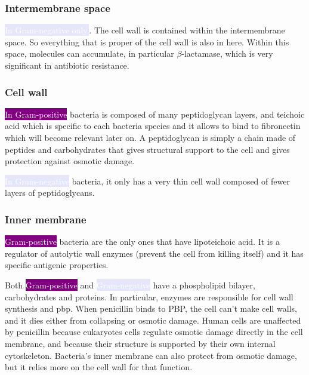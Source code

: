 \subsubsection{Intermembrane space}

\colorbox{Lavender}{\textcolor{white}{In Gram-negative only.}}. The cell wall is contained within the intermembrane space. So everything that is proper of the cell wall is also in here. Within this space, molecules can accumulate, in particular $\beta$-lactamase, which is very significant in antibiotic resistance.

\subsubsection{Cell wall}

\colorbox{Purple}{\textcolor{white}{In Gram-positive}} bacteria is composed of many peptidoglycan layers, and teichoic acid which is specific to each bacteria species and it allows to bind to fibronectin which will become relevant later on. A peptidoglycan is simply a chain made of peptides and carbohydrates that gives structural support to the cell and gives protection against osmotic damage.

\colorbox{Lavender}{\textcolor{white}{In Gram-negative}} bacteria, it only has a very thin cell wall composed of fewer layers of peptidoglycans.


\subsubsection{Inner membrane}

\colorbox{Purple}{\textcolor{white}{Gram-positive}} bacteria are the only ones that have lipoteichoic acid. It is a regulator of autolytic wall enzymes (prevent the cell from killing itself) and it has specific antigenic properties.

Both \colorbox{Purple}{\textcolor{white}{Gram-positive}} and \colorbox{Lavender}{\textcolor{white}{Gram-negative}} have a phospholipid bilayer, carbohydrates and proteins. In particular, enzymes are responsible for cell wall synthesis and \gls{pbp}. When penicillin binds to PBP, the cell can't make cell walls, and it dies either from collapsing or osmotic damage. Human cells are unaffected by penicillin because eukaryotes cells regulate osmotic damage directly in the cell membrane, and because their structure is supported by their own internal cytoskeleton. Bacteria's inner membrane can also protect from osmotic damage, but it relies more on the cell wall for that function.

